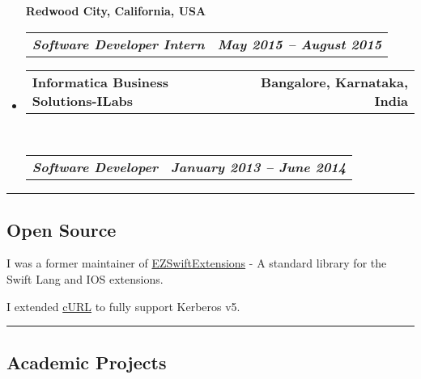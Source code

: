 \documentclass[10pt,letterpaper]{article}
\makeatletter
\newcommand{\headerrow}[2]
{\begin{tabular*}{\linewidth}{l@{\extracolsep{\fill}}r}
	#1 &
	#2 \\
\end{tabular*}}
\makeatother
\begin{document}
\begin{itemize}
			{\textbf{Redwood City, California, USA}}
		\\
		\headerrow
			{\emph{\textbf{Software Developer Intern}}}
			{\emph{\textbf{May 2015 -- August 2015}}}
	\item
	\headerrow
		{\textbf{Informatica Business Solutions-ILabs}}
		{\textbf{Bangalore, Karnataka, India}}
	\\
	\headerrow
		{\emph{\textbf{Software Developer}}}
		{\emph{\textbf{January 2013 -- June 2014}}}
\end{itemize}

\hrule
\vspace{-0.4em}

\subsection*{Open Source}

\begin{itemize*}
	\item I was a former maintainer of \href{https://github.com/goktugyil/EZSwiftExtensions}{EZSwiftExtensions} - A standard library for the Swift Lang and IOS extensions.
	\item I extended \href{https://github.com/Khalian/curl}{cURL} to fully support Kerberos v5. 
	
\end{itemize*}


\hrule
\vspace{-0.4em}

\subsection*{Academic Projects}
\end{document}
